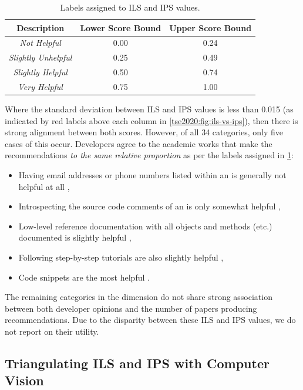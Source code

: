 \begin{table}
  \centering
  \caption[Labels assigned to ILS and IPS values]{Labels assigned to ILS and IPS values.}
  \label{tse2020:tab:labels-for-ils-ips}
  \begin{tabular}{c|cc}
    \toprule
    \textbf{Description} & \textbf{Lower Score Bound} & \textbf{Upper Score Bound}\\
    \midrule
    \textit{Not Helpful} & 0.00 & 0.24\\
    \textit{Slightly Unhelpful} & 0.25 & 0.49 \\
    \textit{Slightly Helpful} & 0.50 & 0.74 \\
    \textit{Very Helpful} & 0.75 & 1.00\\
    \bottomrule
  \end{tabular}
\end{table}

Where the standard deviation between ILS and IPS values is less than 0.015 (as indicated by red labels above each column in \cref{tse2020:fig:ils-vs-ips}), then there is strong alignment between both scores. However, of all 34 categories, only five cases of this occur.
Developers agree to the academic works that make the recommendations \textit{to the same relative proportion} as per the labels assigned in \cref{tse2020:tab:labels-for-ils-ips}:

\begin{itemize}
  \item Having email addresses or phone numbers listed within an  is generally not helpful at all ,
  \item Introspecting the source code comments of an  is only somewhat helpful ,
  \item Low-level reference documentation with all objects and methods (etc.) documented is slightly helpful ,
  \item Following step-by-step tutorials are also slightly helpful ,
  \item Code snippets are the most helpful .
\end{itemize}

The remaining categories in the dimension do not share strong association between both developer opinions and the number of papers producing recommendations. Due to the disparity between these ILS and IPS values, we do not report on their utility.

\subsection{Triangulating ILS and IPS with Computer Vision}

